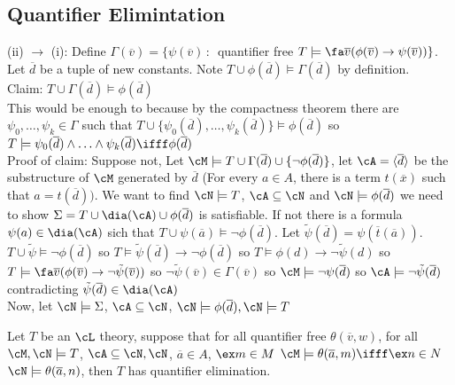 
\subsection{Quantifier Elimintation}

\begin{pf}
    (ii) $\to$ (i): Define $\Gamma(\overline{v}) = \{\psi(\overline{v}) \, : \, $ quantifier free $T \models \fa \overline{v}(\phi(\overline{v}) \to \psi(\overline{v}))\}$. Let $\overline{d}$ be a tuple of new constants. Note $T \cup \phi(\overline{d}) \models \Gamma(\overline{d})$ by definition. \\
    Claim: $T \cup \Gamma(\overline{d}) \models \phi(\overline{d})$ \\
    This would be enough to because by the compactness theorem there are $\psi_0, \ldots, \psi_k \in \Gamma$ such that $T \cup \{\psi_0(\overline{d}), \ldots, \psi_k(\overline{d})\} \models \phi(\overline{d})$ so $T \models \psi_0(\overline{d}) \wedge \ldots \wedge \psi_k(\overline{d}) \ifff \phi(\overline{d})$ \\
    Proof of claim: Suppose not, Let $\cM \models T \cup \Gamma(\overline{d}) \cup \{\neg \phi(\overline{d})\}$, let $\cA = \langle \overline{d} \rangle$ be the substructure of $\cM$ generated by $\overline{d}$ (For every $a \in A$, there is a term $t(\overline{x})$ such that $a = t(\overline{d}))$. We want to find $\cN \models T$, $\cA \subseteq \cN$ and $\cN \models \phi(\overline{d})$ we need to show $\Sigma = T \cup \dia(\cA) \cup \phi(\overline{d})$ is satisfiable. If not there is a formula $\psi(a) \in \dia(\cA)$ sich that $T \cup \psi(\overline{a}) \models \neg \phi(\overline{d})$. Let $\tilde{\psi}(\overline{d}) = \psi(\overline{t}(\overline{a}))$. $T \cup \tilde{\psi} \models \neg \phi(\overline{d})$ so $T \models \tilde{\psi}(\overline{d}) \to \neg \phi(\overline{d})$ so $T \models \phi(d) \to \neg \tilde{\psi}(d)$ so $T \models \fa \overline{v}(\phi(\overline{v}) \to \neg \tilde{\psi}(\overline{v}))$ so $\neg \tilde{\psi}(\overline{v}) \in \Gamma(\overline{v})$ so $\cM \models \neg \psi(\overline{d})$ so $\cA \models \neg \tilde{\psi}(\overline{d})$ contradicting $\tilde{\psi}(\overline{d}) \in \dia(\cA)$ \\
    Now, let $\cN \models \Sigma$, $\cA \subseteq \cN$, $\cN \models \phi(\overline{d}), \cN  \models T$ 
\end{pf}

\begin{corollary}
    Let $T$ be an $\cL$ theory, suppose that for all quantifier free $\theta(\overline{v}, w)$, for all $\cM, \cN \models T$, $\cA \subseteq \cN, \cN$, $\overline{a} \in A$, $\ex m \in M$ $\cM \models \theta(\overline{a}, m) \ifff \ex n \in N$ $\cN \models \theta(\overline{a}, n)$, then $T$ has quantifier elimination. 
\end{corollary}

